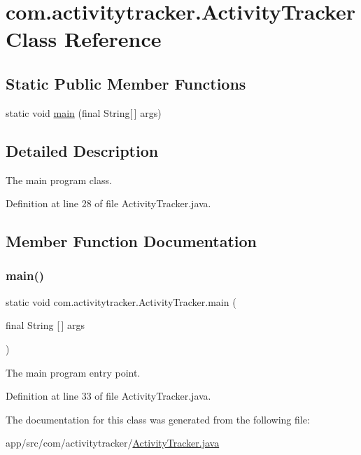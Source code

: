 \hypertarget{classcom_1_1activitytracker_1_1_activity_tracker}{}\section{com.\+activitytracker.\+Activity\+Tracker Class Reference}
\label{classcom_1_1activitytracker_1_1_activity_tracker}
\subsection*{Static Public Member Functions}
\begin{DoxyCompactItemize}
\item 
static void \mbox{\hyperlink{classcom_1_1activitytracker_1_1_activity_tracker_a29cfd2975a07afe34e2a3112cbf32dc8}{main}} (final String\mbox{[}$\,$\mbox{]} args)
\end{DoxyCompactItemize}


\subsection{Detailed Description}
The main program class. 

Definition at line 28 of file Activity\+Tracker.\+java.



\subsection{Member Function Documentation}
\mbox{\label{classcom_1_1activitytracker_1_1_activity_tracker_a29cfd2975a07afe34e2a3112cbf32dc8}} 
\subsubsection{\texorpdfstring{main()}{main()}}
{\footnotesize\ttfamily static void com.\+activitytracker.\+Activity\+Tracker.\+main (\begin{DoxyParamCaption}\item[{final String \mbox{[}$\,$\mbox{]}}]{args }\end{DoxyParamCaption})\hspace{0.3cm}{\ttfamily [static]}}

The main program entry point. 

Definition at line 33 of file Activity\+Tracker.\+java.



The documentation for this class was generated from the following file\+:\begin{DoxyCompactItemize}
\item 
app/src/com/activitytracker/\mbox{\hyperlink{_activity_tracker_8java}{Activity\+Tracker.\+java}}\end{DoxyCompactItemize}
